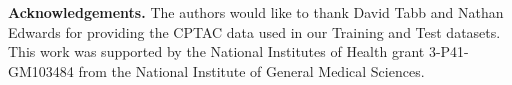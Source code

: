 \documentclass[endnotes,11pt]{article}
\begin{document}
{\bf Acknowledgements. }
The authors would like to thank David Tabb and Nathan Edwards for providing the CPTAC data used in our Training and Test datasets. This work was supported by the National Institutes of Health grant 3-P41-GM103484 from the National Institute of General Medical Sciences.


\newpage

\end{document}
